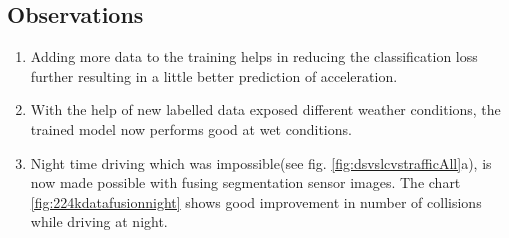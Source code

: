 \subsection*{Observations}
\begin{enumerate}
    \item Adding more data to the training helps in reducing the classification loss
        further resulting in a little better prediction of acceleration.
    \item With the help of new labelled data exposed different weather conditions, the
        trained model now performs good at wet conditions.
    \item Night time driving which was impossible(see fig. \ref{fig:dsvslcvstrafficAll}a),
        is now made possible with fusing segmentation sensor images. The chart
        \ref{fig:224kdatafusionnight} shows good improvement in number of collisions
        while driving at night.
\end{enumerate}
